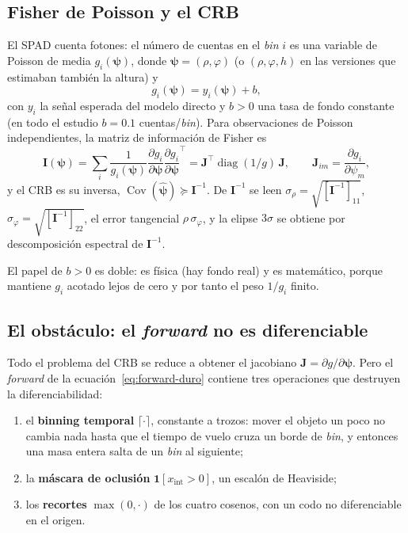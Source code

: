 \documentclass[11pt,a4paper]{article}
\newcommand{\vect}[1]{\boldsymbol{#1}}
\newcommand{\matr}[1]{\mathbf{#1}}
\theoremstyle{definition}
\begin{document}
\subsection{Fisher de Poisson y el CRB}

El SPAD cuenta fotones: el número de cuentas en el \emph{bin} $i$ es una
variable de Poisson de media $g_i(\vect\psi)$, donde
$\vect\psi=(\rho,\varphi)$ (o $(\rho,\varphi,h)$ en las versiones que
estimaban también la altura) y
%
\begin{equation}
g_i(\vect\psi) = y_i(\vect\psi) + b,
\end{equation}
%
con $y_i$ la señal esperada del modelo directo y $b>0$ una tasa de fondo
constante (en todo el estudio $b=0.1$ cuentas/\emph{bin}). Para observaciones
de Poisson independientes, la matriz de información de Fisher es
%
\begin{equation}
\label{eq:fisher}
\matr I(\vect\psi)
= \sum_i \frac{1}{g_i(\vect\psi)}
  \frac{\partial g_i}{\partial\vect\psi}
  \frac{\partial g_i}{\partial\vect\psi}^{\!\top}
= \matr J^\top \operatorname{diag}(1/g)\, \matr J ,
\qquad
\matr J_{im} = \frac{\partial g_i}{\partial\psi_m},
\end{equation}
%
y el CRB es su inversa, $\operatorname{Cov}(\hat{\vect\psi})\succeq
\matr I^{-1}$. De $\matr I^{-1}$ se leen $\sigma_\rho=\sqrt{[\matr
I^{-1}]_{11}}$, $\sigma_\varphi=\sqrt{[\matr I^{-1}]_{22}}$, el error
tangencial $\rho\,\sigma_\varphi$, y la elipse $3\sigma$ se obtiene por
descomposición espectral de $\matr I^{-1}$.

El papel de $b>0$ es doble: es física (hay fondo real) y es matemático, porque
mantiene $g_i$ acotado lejos de cero y por tanto el peso $1/g_i$ finito.

\subsection{El obstáculo: el \emph{forward} no es diferenciable}

Todo el problema del CRB se reduce a obtener el jacobiano $\matr J = \partial
g/\partial\vect\psi$. Pero el \emph{forward} de la
ecuación~\eqref{eq:forward-duro} contiene tres operaciones que destruyen la
diferenciabilidad:
%
\begin{enumerate}[label=(\roman*),leftmargin=*]
  \item el \textbf{binning temporal} $\lceil\cdot\rceil$, constante a trozos:
        mover el objeto un poco no cambia nada hasta que el tiempo de vuelo
        cruza un borde de \emph{bin}, y entonces una masa entera salta de un
        \emph{bin} al siguiente;
  \item la \textbf{máscara de oclusión} $\mathbf 1[x_{\text{int}}>0]$, un
        escalón de Heaviside;
  \item los \textbf{recortes} $\max(0,\cdot)$ de los cuatro cosenos, con un
        codo no diferenciable en el origen.
\end{enumerate}
\end{document}

